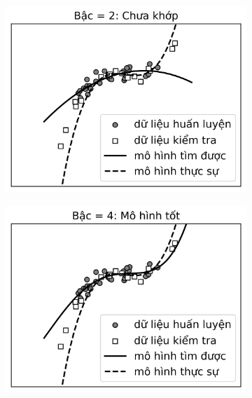 \begin{figure}[t]
\begin{subfigure}{0.49\textwidth}
\includegraphics[width=0.99\linewidth]{ebookML_src/src/overfitting/poly2.png}
\caption{}
\label{fig:15_polyrega}
\end{subfigure}
\begin{subfigure}{0.49\textwidth}
\includegraphics[width=0.99\linewidth]{ebookML_src/src/overfitting/poly4.png}
\caption{}
\label{fig:15_polyregb}
\end{subfigure}
\begin{subfigure}{0.49\textwidth}

\end{subfigure}
\end{figure}
